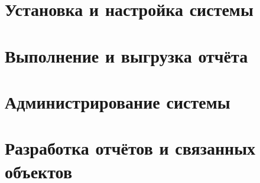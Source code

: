 \documentclass[a4paper, 11pt]{scrbook}
\begin{document}
	
	\tableofcontents

	\chapter{Установка и настройка системы} \label{chapter:installation-and-settings}
	
	
	\chapter{Выполнение и выгрузка отчёта} \label{chapter:report-running}
		
	
	\chapter{Администрирование системы} \label{chapter:administration}
	
	
	\chapter{Разработка отчётов и связанных объектов} \label{chapter:developing}
	
	
	
\end{document}
